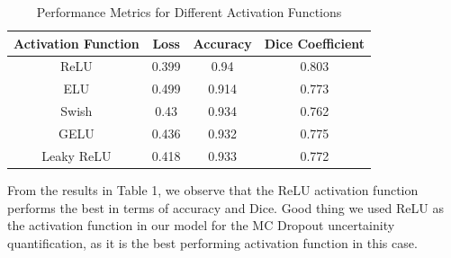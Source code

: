 \documentclass{article}
\begin{document}
\begin{table}[h!]
    \centering
    \begin{tabular}{|c|c|c|c|}
        \hline
        \textbf{Activation Function} & \textbf{Loss} & \textbf{Accuracy} & \textbf{Dice Coefficient} \\
        \hline
        ReLU & 0.399 & 0.94 & 0.803 \\
        \hline
        ELU & 0.499 & 0.914 & 0.773 \\
        \hline
        Swish & 0.43 & 0.934 & 0.762 \\
        \hline
        GELU & 0.436 & 0.932 & 0.775 \\
        \hline
        Leaky ReLU & 0.418 & 0.933 & 0.772 \\
        \hline
    \end{tabular}
    \caption{Performance Metrics for Different Activation Functions}
    \label{tab:activation_functions}
\end{table}

From the results in Table 1, we observe that the ReLU activation function performs the best in terms of accuracy and Dice. 
Good thing we used ReLU as the activation function in our model for the MC Dropout uncertainity quantification, as it is 
the best performing activation function in this case.
\end{document}
